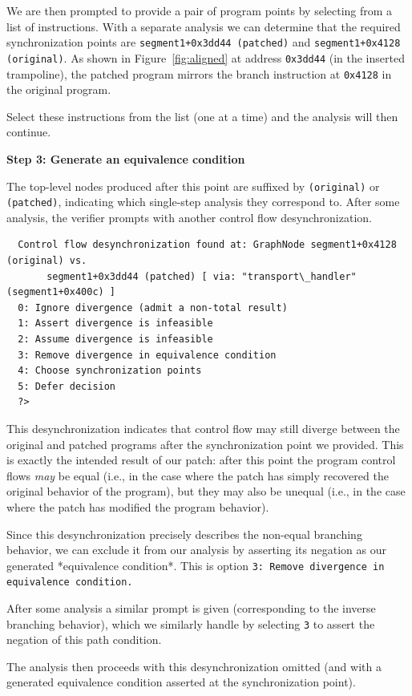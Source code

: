 We are then prompted to provide a pair of program points by selecting from a list of instructions.
With a separate analysis we can determine that the required synchronization points are \texttt{segment1+0x3dd44 (patched)} and \texttt{segment1+0x4128 (original)}.
As shown in Figure~\ref{fig:aligned}  at address \texttt{0x3dd44} (in the inserted trampoline), the patched program mirrors the branch instruction at \texttt{0x4128} in the original program.

Select these instructions from the list (one at a time) and the analysis will then continue.

\noindent\textbf{Step 3: Generate an equivalence condition}

The top-level nodes produced after this point are suffixed by \texttt{(original)} or \texttt{(patched)}, indicating which single-step analysis they correspond to.
After some analysis, the verifier prompts with another control flow desynchronization.
\begin{verbatim}
  Control flow desynchronization found at: GraphNode segment1+0x4128 (original) vs.
       segment1+0x3dd44 (patched) [ via: "transport\_handler" (segment1+0x400c) ]
  0: Ignore divergence (admit a non-total result)
  1: Assert divergence is infeasible
  2: Assume divergence is infeasible
  3: Remove divergence in equivalence condition
  4: Choose synchronization points
  5: Defer decision
  ?>
\end{verbatim}
This desynchronization indicates that control flow may still diverge between the original and patched programs after the synchronization point we provided.
This is exactly the intended result of our patch: after this point the program control flows \emph{may} be equal (i.e., in the case where the patch has simply recovered the original behavior of the program), but they may also be unequal (i.e., in the case where the patch has modified the program behavior).

Since this desynchronization precisely describes the non-equal branching behavior, we can exclude it from our analysis by asserting its negation as our generated *equivalence condition*.
This is option \texttt{3: Remove divergence in equivalence condition.}

After some analysis a similar prompt is given (corresponding to the inverse branching behavior), which we similarly handle by selecting \texttt{3} to assert the negation of this path condition.

The analysis then proceeds with this desynchronization omitted (and with a generated equivalence condition asserted at the synchronization point).

